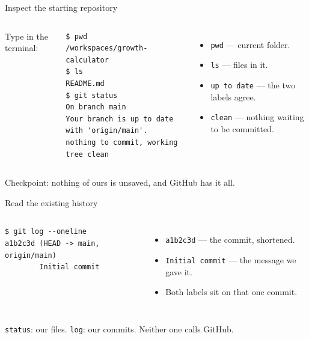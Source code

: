 \documentclass[aspectratio=169,11pt]{beamer}
\begin{document}
\begin{frame}[fragile]{Inspect the starting repository}
\begin{columns}[T,onlytextwidth]
  Type in the terminal:
\begin{lstlisting}[style=terminal]
$ pwd
/workspaces/growth-calculator
$ ls
README.md
$ git status
On branch main
Your branch is up to date with 'origin/main'.
nothing to commit, working tree clean
\end{lstlisting}

  \begin{itemize}
    \item \texttt{pwd} --- current folder.
    \item \texttt{ls} --- files in it.
    \item \texttt{up to date} --- the two labels agree.
    \item \texttt{clean} --- nothing waiting to be committed.
  \end{itemize}
\end{columns}

\vspace{0.9em}
Checkpoint: nothing of ours is unsaved, and GitHub has it all.
\end{frame}

\begin{frame}[fragile]{Read the existing history}
\begin{columns}[T,onlytextwidth]
\begin{lstlisting}[style=terminal]
$ git log --oneline
a1b2c3d (HEAD -> main, origin/main)
        Initial commit
\end{lstlisting}

  \begin{itemize}
    \item \texttt{a1b2c3d} --- the commit, shortened.
    \item \texttt{Initial commit} --- the message we gave it.
    \item Both labels sit on that one commit.
  \end{itemize}
\end{columns}

\vspace{1em}
\texttt{status}: our files. \texttt{log}: our commits. Neither one calls GitHub.
\end{frame}
\end{document}
